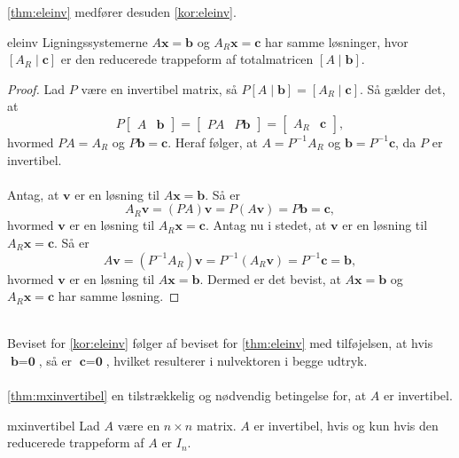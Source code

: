 %
\newpage
\noindent
%
\ref{thm:eleinv} medfører desuden \ref{kor:eleinv}.
% 
\begin{kor}{}{eleinv}
Ligningssystemerne $A\textbf{x}=\textbf{b}$ og $A_R\textbf{x}=\textbf{c}$ har samme løsninger, hvor 
$[A_R \mid \textbf{c}]$
er den reducerede trappeform af totalmatricen
$[A \mid\textbf{b}].$
\end{kor}\noindent
%
\begin{proof}
Lad $P$ være en invertibel matrix, så 
$P[A \mid\textbf{b}]
=
[A_R \mid \textbf{c}]
$.
Så gælder det, at 
$$
P
\begin{bmatrix}
A & \textbf{b}
\end{bmatrix}
=
\begin{bmatrix}
PA & P\textbf{b}
\end{bmatrix}
=
\begin{bmatrix}
A_R & \textbf{c}
\end{bmatrix},
$$
hvormed $PA=A_R$ og $P\textbf{b}=\textbf{c}$.
Heraf følger, at $A=P^{-1}A_R$ og $\textbf{b}=P^{-1}\textbf{c}$, da $P$ er invertibel. 
\\\\
Antag, at $\textbf{v}$ er en løsning til $A\textbf{x}=\textbf{b}$. Så er
$$
A_R\textbf{v}=(PA)\textbf{v}=P(A\textbf{v})=P\textbf{b}=\textbf{c},
$$
hvormed $\textbf{v}$ er en løsning til $A_R\textbf{x}=\textbf{c}$. 
Antag nu i stedet, at $\textbf{v}$ er en løsning til $A_R\textbf{x}=\textbf{c}$. Så er
$$
A\textbf{v}=(P^{-1}A_R)\textbf{v}=P^{-1}(A_R\textbf{v})=P^{-1}\textbf{c}=\textbf{b},
$$
hvormed $\textbf{v}$ er en løsning til $A\textbf{x}=\textbf{b}$. 
Dermed er det bevist, at $A\textbf{x}=\textbf{b}$ og $A_R\textbf{x}=\textbf{c}$ har samme løsning.

\end{proof}
\\
Beviset for \ref{kor:eleinv} følger af beviset for \ref{thm:eleinv} med tilføjelsen, at hvis $\textbf{b}=\textbf{0}$, så er $\textbf{c}=\textbf{0}$, hvilket resulterer i nulvektoren i begge udtryk.\\\\
%
\ref{thm:mxinvertibel}  en tilstrækkelig og nødvendig betingelse for, at $A$ er invertibel.
%
\begin{thm}{}{mxinvertibel}
Lad $A$ være en $n \times n$ matrix. 
$A$ er invertibel, hvis og kun hvis den reducerede trappeform af $A$ er $I_n$.
\end{thm}
%
